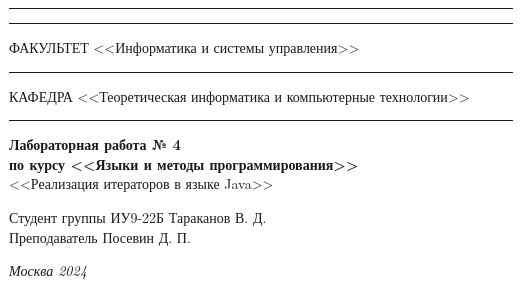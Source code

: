\documentclass[a4paper, 14pt]{extarticle}
\begin{document}
\begin{titlepage}
		\vspace{-25pt}
		\hspace{-35pt}\rule{\textwidth}{2.3pt}
		
		\vspace*{-20.3pt}
		\hspace{-35pt}\rule{\textwidth}{0.4pt}
		
		\vspace{1.5ex}
		\hspace{-35pt} \noindent \small ФАКУЛЬТЕТ\hspace{80pt} <<Информатика и системы управления>>
		
		\vspace*{-16pt}
		\hspace{47pt}\rule{0.83\textwidth}{0.4pt}
		
		\vspace{0.5ex}
		\hspace{-35pt} \noindent \small КАФЕДРА\hspace{50pt} <<Теоретическая информатика и компьютерные технологии>>
		
		\vspace*{-16pt}
		\hspace{30pt}\rule{0.866\textwidth}{0.4pt}
		
		\vspace{11em}
		
		\begin{center}
			\Large {\bf Лабораторная работа № 4} \\ 
			\large {\bf по курсу <<Языки и методы программирования>>} \\
			\large <<Реализация итераторов в языке Java>> 
		\end{center}\normalsize
		
		\vspace{8em}
		
		
		\begin{flushright}
			{Студент группы ИУ9-22Б Тараканов В. Д. \hspace*{15pt}\\ 
				\vspace{2ex}
				Преподаватель Посевин Д. П.\hspace*{15pt}}
		\end{flushright}
		
		\bigskip
		
		\vfill
		
		
		\begin{center}
			\textsl{Москва 2024}
		\end{center}
	\end{titlepage}
	
\end{document}

